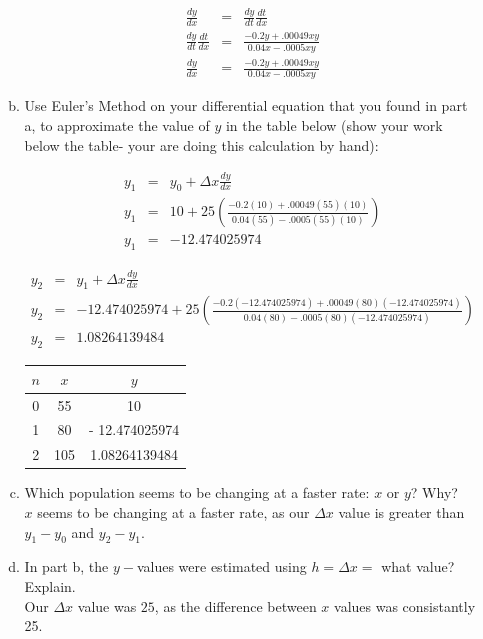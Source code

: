 \documentclass[12pt,letterpaper]{article}
\begin{document}
\begin{enumerate}
\begin{enumerate}[a)]
\begin{eqnarray*}
  \frac{dy}{dx} &=& \frac{dy}{dt} \frac{dt}{dx}\\
  \frac{dy}{dt} \frac{dt}{dx} &=& \frac{-0.2y + .00049xy}{0.04x - .0005xy}\\
  \frac{dy}{dx} &=& \frac{-0.2y + .00049xy}{0.04x - .0005xy}
\end{eqnarray*}


\item Use Euler's Method on your differential equation that you found in part a, to approximate the value of $y$ in the table below (show your work below the table- your are doing this calculation by hand):

\begin{eqnarray*}
  y_1 &=& y_0 + \Delta x \frac{dy}{dx}\\
  y_1 &=& 10 + 25(\frac{-0.2(10) + .00049(55)(10)}{0.04(55) - .0005(55)(10)})\\
  y_1 &=& - 12.474025974
\end{eqnarray*}

\begin{eqnarray*}
  y_2 &=& y_1 + \Delta x \frac{dy}{dx}\\
  y_2 &=& - 12.474025974 + 25(\frac{-0.2(- 12.474025974) + .00049(80)(- 12.474025974)}{0.04(80) - .0005(80)(- 12.474025974)})\\
  y_2 &=& 1.08264139484
\end{eqnarray*}

\begin{center}
\begin{tabular}{| c| c |c| }\hline
$n$ & $x$& $y$ \\ \hline
0 &55 & 10  \\ \hline 
1 &80 &  - 12.474025974\\ \hline
2 &105 & 1.08264139484 \\ \hline
\end{tabular}
\end{center}


\item Which population seems to be changing at a faster rate: $x$ or $y$? Why?\\
 $x$ seems to be changing at a faster rate, as our $\Delta x$ value is greater than 
 $y_1 - y_0$ and $y_2 - y_1$. 

\item  In part b, the $y-$values were estimated using $h=\Delta x=$ what value? Explain.
\\
Our $\Delta x$ value was $25$, as the difference between $x$ values was consistantly 25. 


\end{enumerate}
\end{enumerate}
\end{document}
